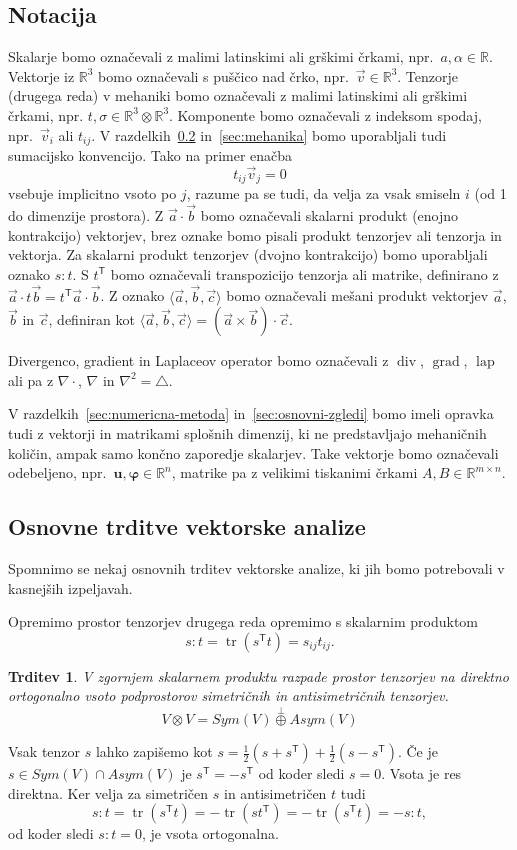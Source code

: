 \documentclass[a4paper,twoside]{article}
\theoremstyle{definition} %
\theoremstyle{plain} %
\newtheorem{trditev}[definicija]{Trditev}
\numberwithin{equation}{section}
\newcommand{\R}{\mathbb R}
\newcommand{\T}{\mathsf{T}}
\newcommand{\lap}{\operatorname{lap}}
\renewcommand{\div}{\operatorname{div}}
\newcommand{\grad}{\operatorname{grad}}
\renewcommand{\b}{\boldsymbol}
\renewcommand{\phi}{\varphi}
\newcommand{\vv}{\vec{v}}
\newcommand{\va}{\vec{a}}
\newcommand{\vc}{\vec{c}}
\newcommand{\vb}{\vec{b}}
\DeclareMathOperator{\tr}{tr}
\begin{document}
\subsection{Notacija}
Skalarje bomo označevali z malimi latinskimi ali grškimi črkami, npr.\ $a, \alpha
\in \R$. Vektorje iz $\R^3$ bomo označevali s puščico nad črko, npr.\ $\vv \in
\R^3$. Tenzorje (drugega reda) v mehaniki bomo označevali z malimi latinskimi ali grškimi
črkami, npr. $t, \sigma \in \R^3\otimes\R^3$.
Komponente bomo označevali z indeksom spodaj, npr.\ $\vv_{i}$ ali $t_{ij}$.
V razdelkih~\ref{sec:uvod-tenz} in~\ref{sec:mehanika} bomo
uporabljali tudi sumacijsko konvencijo. Tako na primer enačba
\[
  t_{ij}\vv_j = 0
\]
vsebuje implicitno vsoto po $j$, razume pa se tudi, da velja za vsak smiseln $i$
(od 1 do dimenzije prostora). Z $\va\cdot\vb$ bomo označevali skalarni produkt
(enojno kontrakcijo) vektorjev, brez oznake bomo pisali produkt tenzorjev ali
tenzorja in vektorja. Za skalarni produkt tenzorjev (dvojno kontrakcijo) bomo
uporabljali oznako $s:t$.  S $t^\T$ bomo označevali transpozicijo tenzorja ali
matrike, definirano z $\va\cdot t\vb = t^\T\va \cdot \vb$. Z oznako $\langle
\va, \vb, \vc\rangle$ bomo označevali mešani produkt vektorjev $\va$, $\vb$ in
$\vc$, definiran kot $\langle \va, \vb, \vc\rangle = (\va\times\vb)\cdot \vc$.

Divergenco, gradient in Laplaceov operator bomo označevali z $\div$, $\grad$,
$\lap$ ali pa z $\nabla\cdot$, $\nabla$ in $\nabla^2 = \triangle$.

V razdelkih~\ref{sec:numericna-metoda} in~\ref{sec:osnovni-zgledi} bomo imeli
opravka tudi z vektorji in matrikami splošnih dimenzij, ki ne predstavljajo
mehaničnih količin, ampak samo končno zaporedje skalarjev. Take vektorje bomo
označevali odebeljeno, npr.\ $\b u, \b\phi \in \R^{n}$, matrike pa z velikimi
tiskanimi črkami $A, B \in \R^{m\times n}$.

\subsection{Osnovne trditve vektorske analize}
\label{sec:uvod-tenz}
Spomnimo se nekaj osnovnih trditev vektorske analize, ki jih bomo
potrebovali v kasnejših izpeljavah.

Opremimo prostor tenzorjev drugega reda
opremimo s skalarnim produktom
\[ s:t = \tr(s^\T t) = s_{ij}t_{ij}.\]
\begin{trditev}
  \label{trd:dot-antisym-tensor}
  V zgornjem skalarnem produktu razpade prostor tenzorjev na direktno
  ortogonalno vsoto podprostorov simetričnih in antisimetričnih tenzorjev.
  \[V\otimes V = Sym(V) \overset{\perp}{\oplus} Asym(V) \]
\end{trditev}
\proof
  Vsak tenzor $s$ lahko zapišemo kot $s = \frac12 (s+s^\T) + \frac12(s-s^\T)$.
  Če je $s \in Sym(V)\cap Asym(V)$ je $s^\T = -s^\T$ od koder sledi $s = 0$.
  Vsota je res direktna. Ker velja za simetričen $s$ in antisimetričen $t$ tudi
  \[ s:t = \tr(s^\T t) =  -\tr(s t^\T) = -\tr(s^\T t) = -s:t,\]
  od koder sledi $s:t = 0$, je vsota ortogonalna.
\endproof
\end{document}
